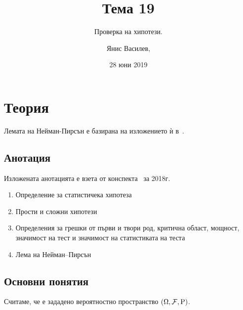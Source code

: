 \documentclass[numbers=endperiod, DIV=15, bibliography=totocnumbered]{scrartcl}
\title{Тема 19}
\subtitle{Проверка на хипотези.}
\author{Янис Василев, \Email{ianis@ivasilev.net}}
\date{28 юни 2019}
\begin{document}
\maketitle

\section{Теория}

Лемата на Нейман-Пирсън е базирана на изложението ѝ в~\cite{DimitrovYanev}.

\subsection{Анотация}

Изложената анотацията е взета от конспекта~\cite{Syllabus} за 2018г.

\begin{enumerate}
  \item Определение за статистичека хипотеза
  \item Прости и сложни хипотези
  \item Определения за грешки от първи и твори род, критична област, мощност, значимост на тест и значимост на статистиката на теста
  \item Лема на Нейман–Пирсън
\end{enumerate}

\subsection{Основни понятия}

Считаме, че е зададено вероятностно пространство $(\Omega, \mathcal{F}, \operatorname{P})$.
\end{document}
